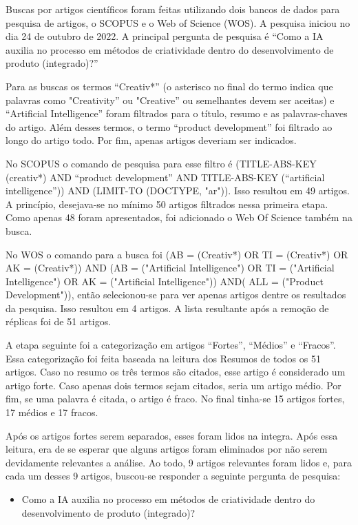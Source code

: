Buscas por artigos científicos foram feitas utilizando dois bancos de dados para pesquisa de artigos, o SCOPUS e o Web of Science (WOS). A pesquisa iniciou no dia 24 de outubro de 2022. A principal pergunta de pesquisa é “Como a IA auxilia no processo em métodos de criatividade dentro do desenvolvimento de produto (integrado)?”

Para as buscas os termos “Creativ*” (o asterisco no final do termo indica que palavras como "Creativity” ou "Creative” ou semelhantes devem ser aceitas) e “Artificial Intelligence” foram filtrados para o título, resumo e as palavras-chaves do artigo. Além desses termos, o termo “product development” foi filtrado ao longo do artigo todo. Por fim, apenas artigos deveriam ser indicados. 

No SCOPUS o comando de pesquisa para esse filtro é (TITLE-ABS-KEY (creativ*) AND “product  development” AND TITLE-ABS-KEY (“artificial intelligence”)) AND (LIMIT-TO (DOCTYPE, "ar")). Isso resultou em 49 artigos. A princípio, desejava-se no mínimo 50 artigos filtrados nessa primeira etapa. Como apenas 48 foram apresentados, foi adicionado o Web Of Science também na busca.

No WOS o comando para a busca foi (AB = (Creativ*) OR TI = (Creativ*) OR AK = (Creativ*)) AND (AB = ("Artificial Intelligence") OR TI = ("Artificial Intelligence") OR AK = ("Artificial Intelligence")) AND( ALL = ("Product Development")), então selecionou-se para ver apenas artigos dentre os resultados da pesquisa. Isso resultou em 4 artigos. A lista resultante após a remoção de réplicas foi de 51 artigos. 

A etapa seguinte foi a categorização em artigos “Fortes”, “Médios” e “Fracos”. Essa categorização foi feita baseada na leitura dos Resumos de todos os 51 artigos. Caso no resumo os três termos são citados, esse artigo é considerado um artigo forte. Caso apenas dois termos sejam citados, seria um artigo médio. Por fim, se uma palavra é citada, o artigo é fraco. No final tinha-se 15 artigos fortes, 17 médios e 17 fracos.

Após os artigos fortes serem separados, esses foram lidos na integra. Após essa leitura, era de se esperar que alguns artigos foram eliminados por não serem devidamente relevantes a análise. Ao todo, 9 artigos relevantes foram lidos e, para cada um desses 9 artigos, buscou-se responder a seguinte pergunta de pesquisa:

\begin{itemize}

    \item Como a IA auxilia no processo em métodos de criatividade dentro do desenvolvimento de produto (integrado)?


\end{itemize}


